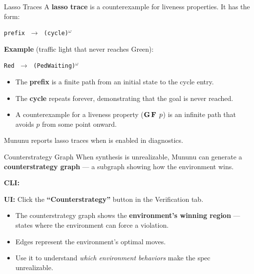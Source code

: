 \begin{frame}{Lasso Traces}
  A \textbf{lasso trace} is a counterexample for liveness properties. It has the form:

  \bigskip
  \begin{center}
    \texttt{prefix} $\;\to\;$ \texttt{(cycle)}$^\omega$
  \end{center}

  \bigskip
  \textbf{Example} (traffic light that never reaches Green):

  \medskip
  \begin{center}
    \texttt{Red} $\;\to\;$ \texttt{(PedWaiting)}$^\omega$
  \end{center}

  \bigskip
  \begin{itemize}
    \item The \textbf{prefix} is a finite path from an initial state to the cycle entry.
    \item The \textbf{cycle} repeats forever, demonstrating that the goal is never reached.
    \item A counterexample for a liveness property ($\mathbf{G}\,\mathbf{F}\,\; p$) is an infinite path that \alert{avoids $p$ from some point onward}.
  \end{itemize}

  \medskip
  Mununu reports lasso traces when  is enabled in diagnostics.
\end{frame}

\begin{frame}[fragile]{Counterstrategy Graph}
  When synthesis is unrealizable, Mununu can generate a \textbf{counterstrategy graph} --- a subgraph showing how the environment wins.

  \bigskip
  \textbf{CLI:}

  \bigskip
  \textbf{UI:} Click the \textbf{``Counterstrategy''} button in the Verification tab.

  \bigskip
  \begin{itemize}
    \item The counterstrategy graph shows the \textbf{environment's winning region} --- states where the environment can force a violation.
    \item Edges represent the environment's optimal moves.
    \item Use it to understand \emph{which environment behaviors} make the spec unrealizable.
  \end{itemize}
\end{frame}

